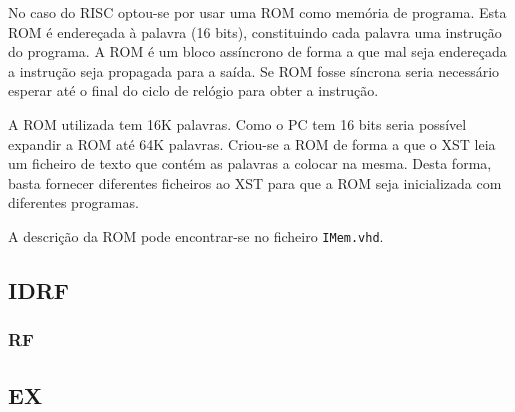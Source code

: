 \documentclass[a4paper]{article}
\begin{document}
			No caso do \textmu RISC optou-se por usar uma ROM como memória de programa. Esta ROM é endereçada à palavra (16 bits), constituindo cada palavra uma instrução do programa. A ROM é um bloco assíncrono de forma a que mal seja endereçada a instrução seja propagada para a saída. Se ROM fosse síncrona seria necessário esperar até o final do ciclo de relógio para obter a instrução.
			
			A ROM utilizada tem 16K palavras. Como o PC tem 16 bits seria possível expandir a ROM até 64K palavras. Criou-se a ROM de forma a que o XST leia um ficheiro de texto que contém as palavras a colocar na mesma. Desta forma, basta fornecer diferentes ficheiros ao XST para que a ROM seja inicializada com diferentes programas.
			
			A descrição da ROM pode encontrar-se no ficheiro \texttt{IMem.vhd}.


		\subsection{IDRF}
			
			
			
			
			
			\subsubsection{RF}
			
		\subsection{EX}
		
\end{document}

